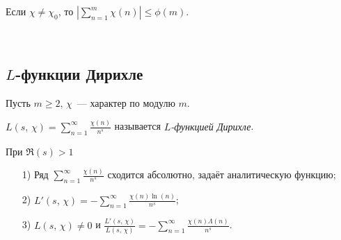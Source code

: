 \begin{corollary} \label{l6_cor}
	Если $\chi \ne \chi_0$, то $\displaystyle \left| \sum\limits_{n=1}^m \chi(n) \right| \leq \phi(m)$.
\end{corollary}~\\

\subsection{$L$-функции Дирихле}
Пусть $m \geq 2, \, \chi$ — характер по модулю $m$.
\begin{definition}
	$\displaystyle L(s, \, \chi) = \sum\limits_{n=1}^\infty \frac{\chi(n)}{n^s}$ называется \textit{$L$-функцией Дирихле}.
\end{definition}

\begin{lemma} \label{l6_lm4}
	При $\Re(s) > 1$
	\begin{enumerate}[nolistsep]
		\item[1)] Ряд $\displaystyle \sum\limits_{n=1}^\infty \frac{\chi(n)}{n^s}$ сходится абсолютно, задаёт аналитическую функцию;
		\item[2)] $\displaystyle L'(s, \, \chi) = -\sum\limits_{n=1}^\infty \frac{\chi(n)\ln(n)}{n^s}$;
		\item[3)] $\displaystyle L(s, \, \chi) \ne 0$ и $\frac{L'(s,\,\chi)}{L(s,\,\chi)} = -\sum\limits_{n=1}^\infty \frac{\chi(n)\Lambda(n)}{n^s}$.
	\end{enumerate}
\end{lemma}
